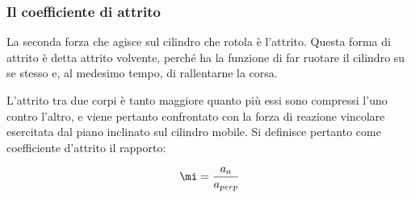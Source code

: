 \subsubsection*{Il coefficiente di attrito}

La seconda forza che agisce sul cilindro che rotola è l'attrito. Questa forma di attrito è detta attrito volvente, perché ha la funzione di far ruotare il cilindro su se stesso e, al medesimo tempo, di rallentarne la corsa.\newline

L'attrito tra due corpi è tanto maggiore quanto più essi sono compressi l'uno contro l'altro, e viene pertanto confrontato con la forza di reazione vincolare esercitata dal piano inclinato sul cilindro mobile. Si definisce pertanto come coefficiente d'attrito il rapporto:

\begin{center}
\begin{equation}
\mi = \frac {a_a}{a_{perp}}
\end{equation}
\end{center}
